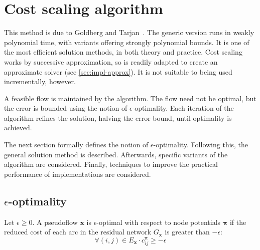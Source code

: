 \section{Cost scaling algorithm} \label{sec:impl-cost-scaling}

This method is due to Goldberg and Tarjan~\cite{Goldberg:1987}. The generic version runs in weakly polynomial time, with variants offering strongly polynomial bounds. It is one of the most efficient solution methods, in both theory and practice\footnotemark. Cost scaling works by successive approximation, so is readily adapted to create an approximate solver (see \cref{sec:impl-approx}). It is not suitable to being used incrementally, however.

A feasible flow is maintained by the algorithm. The flow need not be optimal, but the error is bounded using the notion of $\epsilon$-optimality. Each iteration of the algorithm refines the solution, halving the error bound, until optimality is achieved. 

The next section formally defines the notion of $\epsilon$-optimality. Following this, the general solution method is described. Afterwards, specific variants of the algorithm are considered. Finally, techniques to improve the practical performance of implementations are considered.

\subsection{\texorpdfstring{$\epsilon$}{epsilon}-optimality}

\begin{defn}
\label{defn:epsilon-optimality}
Let $\epsilon \geq 0$. A pseudoflow $\mathbf{x}$ is $\epsilon$-optimal with respect to node potentials $\boldsymbol{\pi}$ if the reduced cost of each arc in the residual network $G_\mathbf{x}$ is greater than $-\epsilon$:
\begin{equation} \label{eq:epsilon-optimality}
\forall (i,j) \in E_{\mathbf{x}}\cdot c^{\boldsymbol{\pi}}_{ij} \geq -\epsilon
\end{equation}
\end{defn}

